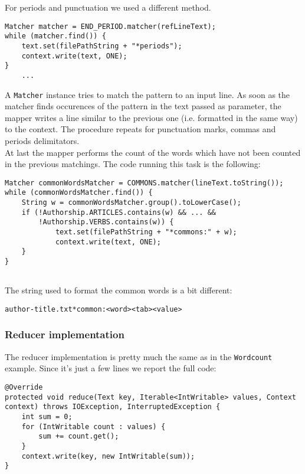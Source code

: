 \documentclass[a4paper,11pt, twoside]{article}
\begin{document}
	\bigskip
	\noindent
	For periods and punctuation we used a different method.
	\begin{lstlisting}[firstnumber=109, caption={Periods counting in Map method}, captionpos=b]
Matcher matcher = END_PERIOD.matcher(refLineText);
while (matcher.find()) {
	text.set(filePathString + "*periods");
	context.write(text, ONE);
}
	...
	\end{lstlisting}
	
	A \lstinline|Matcher| instance tries to match the pattern to an input line. As soon as the matcher finds occurences of the pattern in the text passed as parameter, the mapper writes a line similar to the previous one (i.e. formatted in the same way) to the context. The procedure repeats for punctuation marks, commas and periods delimitators. \\
	
	At last the mapper performs the count of the words which have not been counted in the previous matchings. The code running this task is the following:
	\begin{lstlisting}[firstnumber=119, caption={Common words counting in the Map method.}, captionpos=b]
Matcher commonWordsMatcher = COMMONS.matcher(lineText.toString());
while (commonWordsMatcher.find()) {
	String w = commonWordsMatcher.group().toLowerCase();
	if (!Authorship.ARTICLES.contains(w) && ... &&
		!Authorship.VERBS.contains(w)) {
			text.set(filePathString + "*commons:" + w);
			context.write(text, ONE);
	}
}
		
	\end{lstlisting}
	
	The string used to format the common words is a bit different: \begin{center}
		\texttt{author-title.txt*common:<word><tab><value>}
	\end{center}
	
	\subsubsection{Reducer implementation}
		The reducer implementation is pretty much the same as in the \lstinline|Wordcount| example. Since it's just a few lines we report the full code:
	\begin{lstlisting}[firstnumber=152, caption={Reduce method}, captionpos=b]
@Override
protected void reduce(Text key, Iterable<IntWritable> values, Context context) throws IOException, InterruptedException {
	int sum = 0;
	for (IntWritable count : values) {
		sum += count.get();
	}
	context.write(key, new IntWritable(sum));
}
	\end{lstlisting}
	
\end{document}
